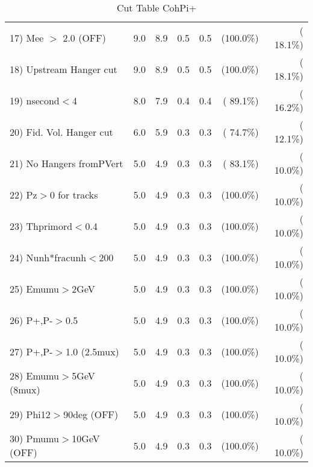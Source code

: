 \begin{table}[h!]
\begin{tabular}{||l||r|r|r|r|r|r||}
 17) Mee $>$ 2.0  (OFF)   &          9.0 &          8.9 &          0.5 &          0.5 & (100.0\%) & ( 18.1\%) \\
 18) Upstream Hanger cut  &          9.0 &          8.9 &          0.5 &          0.5 & (100.0\%) & ( 18.1\%) \\
 19) nsecond$<$4          &          8.0 &          7.9 &          0.4 &          0.4 & ( 89.1\%) & ( 16.2\%) \\
 20) Fid. Vol. Hanger cut &          6.0 &          5.9 &          0.3 &          0.3 & ( 74.7\%) & ( 12.1\%) \\
 21) No Hangers fromPVert &          5.0 &          4.9 &          0.3 &          0.3 & ( 83.1\%) & ( 10.0\%) \\
 22) Pz$>$0 for tracks    &          5.0 &          4.9 &          0.3 &          0.3 & (100.0\%) & ( 10.0\%) \\
 23) Thprimord$<$0.4      &          5.0 &          4.9 &          0.3 &          0.3 & (100.0\%) & ( 10.0\%) \\
 24) Nunh*fracunh$<$200   &          5.0 &          4.9 &          0.3 &          0.3 & (100.0\%) & ( 10.0\%) \\
 25) Emumu$>$2GeV         &          5.0 &          4.9 &          0.3 &          0.3 & (100.0\%) & ( 10.0\%) \\
 26) P+,P-$>$0.5          &          5.0 &          4.9 &          0.3 &          0.3 & (100.0\%) & ( 10.0\%) \\
 27) P+,P-$>$1.0 (2.5mux) &          5.0 &          4.9 &          0.3 &          0.3 & (100.0\%) & ( 10.0\%) \\
 28) Emumu$>$5GeV  (8mux) &          5.0 &          4.9 &          0.3 &          0.3 & (100.0\%) & ( 10.0\%) \\
 29) Phi12$>$90deg  (OFF) &          5.0 &          4.9 &          0.3 &          0.3 & (100.0\%) & ( 10.0\%) \\
 30) Pmumu$>$10GeV  (OFF) &          5.0 &          4.9 &          0.3 &          0.3 & (100.0\%) & ( 10.0\%) \\
 \hline
 \hline
 \end{tabular}
 \caption{Cut Table  CohPi+   }
 \label{tab-cutcohjpsi-mumu_nuecc}
 \end{table}
